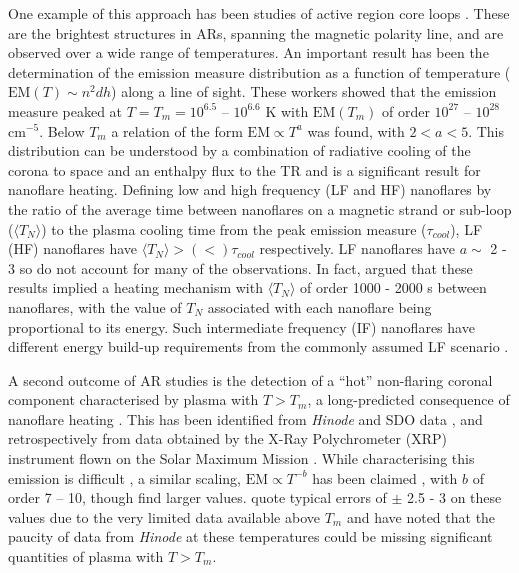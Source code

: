 \documentclass[apj]{emulateapj}
\begin{document}
	\par One example of this approach has been studies of active region core loops \citep{warren_constraints_2011,warren_systematic_2012,winebarger_using_2011,tripathi_emission_2011,schmelz_cold_2012,bradshaw_diagnosing_2012,reep_diagnosing_2013,del_zanna_evolution_2015}. These are the brightest structures in ARs, spanning the magnetic polarity line, and are observed over a wide range of temperatures. An important result has been the determination of the emission measure distribution as a function of temperature ($\mathrm{EM}(T)\sim n^2dh$) along a line of sight. These workers showed that the emission measure peaked at $T = T_m = 10^{6.5}$ – $10^{6.6}$ K with $\mathrm{EM}(T_m)$ of order $10^{27}$ – $10^{28}$ cm$^{-5}$.  Below $T_m$ a relation of the form $\mathrm{EM} \propto T^a$ was found, with $2 < a < 5$. This distribution can be understood by a combination of radiative cooling of the corona to space and an enthalpy flux to the TR \citep[e.g.][]{bradshaw_cooling_2010,bradshaw_new_2010} and is a significant result for nanoflare heating. Defining low and high frequency (LF and HF) nanoflares by the ratio of the average time between nanoflares on a magnetic strand or sub-loop ($\langle T_N \rangle$) to the plasma cooling time from the peak emission measure ($\tau_{cool}$), LF (HF) nanoflares have $\langle T_N \rangle > (<) \tau_{cool}$ respectively. LF nanoflares have $a \sim$ 2 - 3 so do not account for many of the observations. In fact, \citet{cargill_active_2014} argued that these results implied a heating mechanism with $\langle T_N \rangle$ of order 1000 - 2000 s between nanoflares, with the value of $T_N$ associated with each nanoflare being proportional to its energy. Such intermediate frequency (IF) nanoflares have different energy build-up requirements from the commonly assumed LF scenario \citep{cargill_active_2014}.  
%
	\par A second outcome of AR studies is the detection of a ``hot'' non-flaring coronal component characterised by plasma with $T > T_m$, a long-predicted consequence of nanoflare heating \citep{cargill_implications_1994,cargill_diagnostics_1995}. This has been identified from \textit{Hinode} and SDO data \citep{reale_evidence_2009,schmelz_hinode_2009,testa_hinode/eis_2012}, and retrospectively from data obtained by the X-Ray Polychrometer (XRP) instrument flown on the Solar Maximum Mission \citep{del_zanna_elemental_2014}. While characterising this emission is difficult \citep[e.g.][]{testa_temperature_2011,winebarger_defining_2012}, a similar scaling, $\mathrm{EM} \propto T^{-b}$ has been claimed \citep[e.g.][]{warren_systematic_2012}, with $b$ of order 7 – 10, though \citeauthor{del_zanna_elemental_2014} find larger values. \citeauthor{warren_systematic_2012} quote typical errors of $\pm$ 2.5 - 3 on these values due to the very limited data available above $T_m$ and \citeauthor{winebarger_defining_2012} have noted that the paucity of data from \textit{Hinode} at these temperatures could be missing significant quantities of plasma with $T > T_m$.
\end{document}
